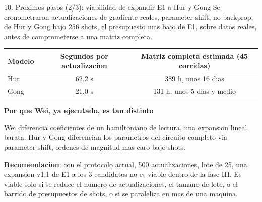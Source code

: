 \documentclass[aspectratio=169]{beamer}
\newcommand{\bmheading}[2]{\textbf{\color{#1}#2}\par\smallskip}
\newcommand{\bandedtable}{\rowcolors{2}{white}{bmRowAlt}}
\begin{document}
\begin{frame}{10. Proximos pasos (2/3): viabilidad de expandir E1 a Hur y Gong}
  \footnotesize
  Se cronometraron actualizaciones de gradiente reales, parameter-shift, no
  backprop, de Hur y Gong bajo 256 shots, el presupuesto mas bajo de E1,
  sobre datos reales, antes de comprometerse a una matriz completa.

  \vspace{6pt}
  \bandedtable
  \begin{tabular}{@{}lcc@{}}
    \toprule
    \textbf{Modelo} & \textbf{Segundos por actualizacion} &
      \textbf{Matriz completa estimada (45 corridas)} \\
    \midrule
    Hur  & 62.2 s & 389 h, unos 16 dias \\
    Gong & 21.0 s & 131 h, unos 5 dias y medio \\
    \bottomrule
  \end{tabular}

  \vspace{6pt}
  \begin{amberbox}
    \bmheading{bmAmber}{Por que Wei, ya ejecutado, es tan distinto}
    Wei diferencia coeficientes de un hamiltoniano de lectura, una expansion
    lineal barata. Hur y Gong diferencian los parametros del circuito
    completo via parameter-shift, ordenes de magnitud mas caro bajo shots.
  \end{amberbox}

  \vspace{6pt}
  \textbf{Recomendacion}: con el protocolo actual, 500 actualizaciones, lote
  de 25, una expansion v1.1 de E1 a los 3 candidatos no es viable dentro de
  la fase III. Es viable solo si se reduce el numero de actualizaciones, el
  tamano de lote, o el barrido de presupuestos de shots, o si se paraleliza
  en mas de una maquina.
\end{frame}
\end{document}
